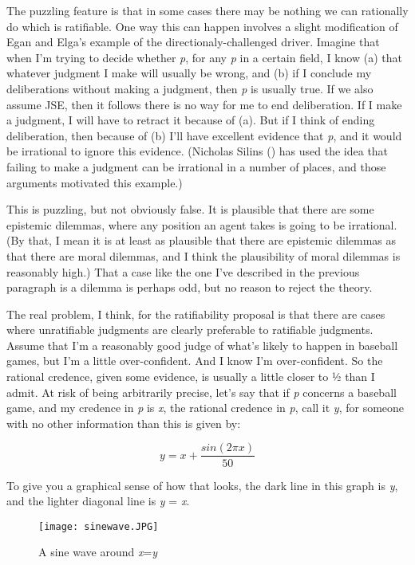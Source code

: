 \documentclass[
  10pt,
  letterpaper,
  DIV=11,
  numbers=noendperiod,
  twoside]{scrartcl}
\begin{document}
The puzzling feature is that in some cases there may be nothing we can
rationally do which is ratifiable. One way this can happen involves a
slight modification of Egan and Elga's example of the
directionaly-challenged driver. Imagine that when I'm trying to decide
whether \emph{p}, for any \emph{p} in a certain field, I know (a) that
whatever judgment I make will usually be wrong, and (b) if I conclude my
deliberations without making a judgment, then \emph{p} is usually true.
If we also assume JSE, then it follows there is no way for me to end
deliberation. If I make a judgment, I will have to retract it because of
(a). But if I think of ending deliberation, then because of (b) I'll
have excellent evidence that \emph{p}, and it would be irrational to
ignore this evidence. (Nicholas Silins ()
has used the idea that failing to make a judgment can be irrational in a
number of places, and those arguments motivated this example.)

This is puzzling, but not obviously false. It is plausible that there
are some epistemic dilemmas, where any position an agent takes is going
to be irrational. (By that, I mean it is at least as plausible that
there are epistemic dilemmas as that there are moral dilemmas, and I
think the plausibility of moral dilemmas is reasonably high.) That a
case like the one I've described in the previous paragraph is a dilemma
is perhaps odd, but no reason to reject the theory.

The real problem, I think, for the ratifiability proposal is that there
are cases where unratifiable judgments are clearly preferable to
ratifiable judgments. Assume that I'm a reasonably good judge of what's
likely to happen in baseball games, but I'm a little over-confident. And
I know I'm over-confident. So the rational credence, given some
evidence, is usually a little closer to ½ than I admit. At risk of being
arbitrarily precise, let's say that if \emph{p} concerns a baseball
game, and my credence in \emph{p} is \emph{x}, the rational credence in
\emph{p}, call it \emph{y}, for someone with no other information than
this is given by:

\[
y = x + \frac{sin(2\pi x)}{50}
\]

To give you a graphical sense of how that looks, the dark line in this
graph is \emph{y}, and the lighter diagonal line is \emph{y} = \emph{x}.

\begin{figure}[H]

{\centering \texttt{[image: sinewave.JPG]}

}

\caption{A sine wave around \emph{x}=\emph{y}}

\end{figure}%
\end{document}
